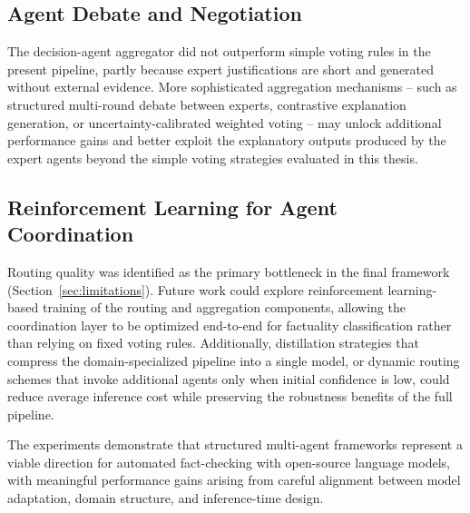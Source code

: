 \subsection{Agent Debate and Negotiation}
The decision-agent aggregator did not outperform simple voting rules in the present pipeline, partly because expert justifications are short and generated without external evidence. More sophisticated aggregation mechanisms -- such as structured multi-round debate between experts, contrastive explanation generation, or uncertainty-calibrated weighted voting -- may unlock additional 
performance gains and better exploit the explanatory outputs produced by the expert agents beyond the simple voting strategies 
evaluated in this thesis.

\subsection{Reinforcement Learning for Agent Coordination}
Routing quality was identified as the primary bottleneck in the final framework (Section~\ref{sec:limitations}). Future work could 
explore reinforcement learning-based training of the routing and aggregation components, allowing the coordination layer to be 
optimized end-to-end for factuality classification rather than relying on fixed voting rules. Additionally, distillation strategies 
that compress the domain-specialized pipeline into a single model, or dynamic routing schemes that invoke additional agents only when initial confidence is low, could reduce average inference cost while preserving the robustness benefits of the full pipeline.

The experiments demonstrate that structured multi-agent frameworks represent a viable direction for automated fact-checking with 
open-source language models, with meaningful performance gains arising from careful alignment between model adaptation, domain 
structure, and inference-time design.
